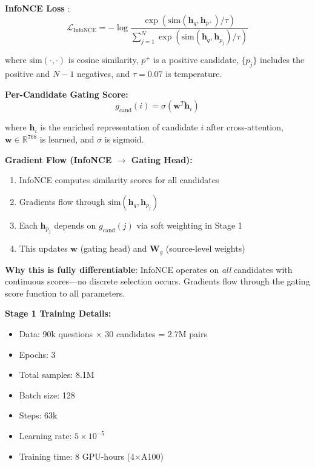 \documentclass[10pt,twocolumn]{article}
\begin{document}
\textbf{InfoNCE Loss} \cite{oord2018infonce}:
\begin{equation}
\mathcal{L}_{\text{InfoNCE}} = -\log \frac{\exp(\text{sim}(\mathbf{h}_q, \mathbf{h}_{p^+}) / \tau)}{\sum_{j=1}^{N} \exp(\text{sim}(\mathbf{h}_q, \mathbf{h}_{p_j}) / \tau)}
\label{eq:infonce}
\end{equation}

where $\text{sim}(\cdot, \cdot)$ is cosine similarity, $p^+$ is a positive candidate, $\{p_j\}$ includes the positive and $N-1$ negatives, and $\tau=0.07$ is temperature.

\textbf{Per-Candidate Gating Score:}
\begin{equation}
g_{\text{cand}}(i) = \sigma(\mathbf{w}^T \mathbf{h}_i)
\label{eq:candidate_gating}
\end{equation}

where $\mathbf{h}_i$ is the enriched representation of candidate $i$ after cross-attention, $\mathbf{w} \in \mathbb{R}^{768}$ is learned, and $\sigma$ is sigmoid.

\textbf{Gradient Flow (InfoNCE $\rightarrow$ Gating Head):}
\begin{enumerate}
    \item InfoNCE computes similarity scores for all candidates
    \item Gradients flow through $\text{sim}(\mathbf{h}_q, \mathbf{h}_{p_j})$
    \item Each $\mathbf{h}_{p_j}$ depends on $g_{\text{cand}}(j)$ via soft weighting in Stage 1
    \item This updates $\mathbf{w}$ (gating head) and $\mathbf{W}_g$ (source-level weights)
\end{enumerate}

\textbf{Why this is fully differentiable}: InfoNCE operates on \textit{all} candidates with continuous scores—no discrete selection occurs. Gradients flow through the gating score function to all parameters.

\textbf{Stage 1 Training Details:}
\begin{itemize}
    \item Data: 90k questions $\times$ 30 candidates = 2.7M pairs
    \item Epochs: 3
    \item Total samples: 8.1M
    \item Batch size: 128
    \item Steps: 63k
    \item Learning rate: $5 \times 10^{-5}$
    \item Training time: 8 GPU-hours (4$\times$A100)
\end{itemize}
\end{document}
